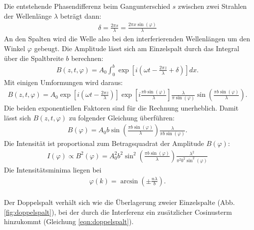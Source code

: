 Die entstehende Phasendifferenz beim Gangunterschied $s$ zwischen zwei Strahlen der Wellenlänge $\lambda$ beträgt dann:
\begin{align*}
  \delta = \frac{2 \pi s}{\lambda} = \frac{2 \pi x \sin{(\varphi)}}{\lambda}
\end{align*}
An den Spalten wird die Welle also bei den interferierenden Wellenlängen um den Winkel $\varphi$ gebeugt.
Die Amplitude lässt sich am Einzelspalt durch das Integral über die Spaltbreite $b$ berechnen:
\begin{align*}
  B(z, t, \varphi) = A_{0} \int_{0}^{b} \exp{ \left[i \left(\omega t - \frac{2 \pi z}{\lambda} + \delta \right) \right]} dx.
\end{align*}
Mit einigen Umformungen wird daraus:
\begin{align*}
  B(z, t, \varphi) = A_{0} \exp{ \left[ i \left(\omega t - \frac{2 \pi z}{\lambda} \right) \right]}
  \exp{\left[  i \frac{\pi b \sin{(\varphi)}}{\lambda} \right]}
  \frac{\lambda}{\pi \sin{(\varphi)}} \sin{ \left( \frac{\pi b \sin{(\varphi)}}{\lambda} \right)}.
\end{align*}
Die beiden exponentiellen Faktoren sind für die Rechnung unerheblich.
Damit lässt sich $B(z, t, \varphi)$ zu folgender Gleichung überführen:
\begin{align*}
    B(\varphi)= A_{0} b \sin{\left( \frac{\pi b \sin{(\varphi)}}{\lambda} \right)} \frac{\lambda}{\pi b \sin{(\varphi)}}.
\end{align*}
Die Intensität ist proportional zum Betragsquadrat der Amplitude $B(\varphi)$:
\begin{align}
  I(\varphi) \propto B^2(\varphi) = A_{0}^2 b^2 \sin^2{\left( \frac{\pi b \sin{(\varphi)}}{\lambda} \right)} \frac{\lambda^2}{\pi^2 b^2 \sin^2{(\varphi)}}
  \label{eqn:einzelspalt}
\end{align}
Die Intensitätsminima liegen bei
\begin{align*}
  \varphi(k) = \arcsin{\left( \pm \frac{n \lambda}{b} \right)}.
\end{align*}
\\Der Doppelspalt verhält sich wie die Überlagerung zweier Einzelspalte (Abb. \ref{fig:doppelspalt}), bei der durch die Interferenz ein zusätzlicher Cosinusterm hinzukommt (Gleichung \eqref{eqn:doppelspalt}).
